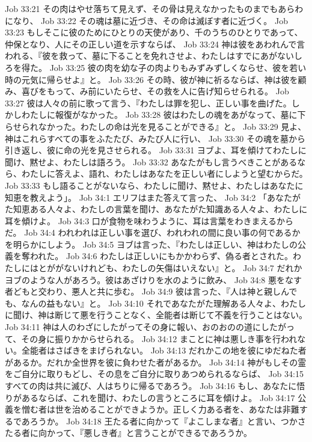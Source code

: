 Job 33:21  その肉はやせ落ちて見えず、その骨は見えなかったものまでもあらわになり、
Job 33:22  その魂は墓に近づき、その命は滅ぼす者に近づく。
Job 33:23  もしそこに彼のためにひとりの天使があり、千のうちのひとりであって、仲保となり、人にその正しい道を示すならば、
Job 33:24  神は彼をあわれんで言われる、『彼を救って、墓に下ることを免れさせよ、わたしはすでにあがないしろを得た。
Job 33:25  彼の肉を幼な子の肉よりもみずみずしくならせ、彼を若い時の元気に帰らせよ』と。
Job 33:26  その時、彼が神に祈るならば、神は彼を顧み、喜びをもって、み前にいたらせ、その救を人に告げ知らせられる。
Job 33:27  彼は人々の前に歌って言う、『わたしは罪を犯し、正しい事を曲げた。しかしわたしに報復がなかった。
Job 33:28  彼はわたしの魂をあがなって、墓に下らせられなかった。わたしの命は光を見ることができる』と。
Job 33:29  見よ、神はこれらすべての事をふたたび、みたび人に行い、
Job 33:30  その魂を墓から引き返し、彼に命の光を見させられる。
Job 33:31  ヨブよ、耳を傾けてわたしに聞け、黙せよ、わたしは語ろう。
Job 33:32  あなたがもし言うべきことがあるなら、わたしに答えよ、語れ、わたしはあなたを正しい者にしようと望むからだ。
Job 33:33  もし語ることがないなら、わたしに聞け、黙せよ、わたしはあなたに知恵を教えよう」。
Job 34:1  エリフはまた答えて言った、
Job 34:2  「あなたがた知恵ある人々よ、わたしの言葉を聞け、あなたがた知識ある人々よ、わたしに耳を傾けよ。
Job 34:3  口が食物を味わうように、耳は言葉をわきまえるからだ。
Job 34:4  われわれは正しい事を選び、われわれの間に良い事の何であるかを明らかにしよう。
Job 34:5  ヨブは言った、『わたしは正しい、神はわたしの公義を奪われた。
Job 34:6  わたしは正しいにもかかわらず、偽る者とされた。わたしにはとががないけれども、わたしの矢傷はいえない』と。
Job 34:7  だれかヨブのような人があろう。彼はあざけりを水のように飲み、
Job 34:8  悪をなす者どもと交わり、悪人と共に歩む。
Job 34:9  彼は言った、『人は神と親しんでも、なんの益もない』と。
Job 34:10  それであなたがた理解ある人々よ、わたしに聞け、神は断じて悪を行うことなく、全能者は断じて不義を行うことはない。
Job 34:11  神は人のわざにしたがってその身に報い、おのおのの道にしたがって、その身に振りかからせられる。
Job 34:12  まことに神は悪しき事を行われない。全能者はさばきをまげられない。
Job 34:13  だれかこの地を彼にゆだねた者があるか。だれか全世界を彼に負わせた者があるか。
Job 34:14  神がもしその霊をご自分に取りもどし、その息をご自分に取りあつめられるならば、
Job 34:15  すべての肉は共に滅び、人はちりに帰るであろう。
Job 34:16  もし、あなたに悟りがあるならば、これを聞け、わたしの言うところに耳を傾けよ。
Job 34:17  公義を憎む者は世を治めることができようか。正しく力ある者を、あなたは非難するであろうか。
Job 34:18  王たる者に向かって『よこしまな者』と言い、つかさたる者に向かって、『悪しき者』と言うことができるであろうか。
